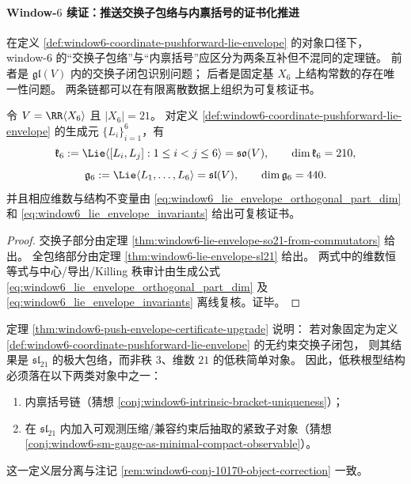 
\paragraph{Window-\(6\) 续证：推送交换子包络与内禀括号的证书化推进}
在定义 \ref{def:window6-coordinate-pushforward-lie-envelope} 的对象口径下，
window-\(6\) 的“交换子包络”与“内禀括号”应区分为两条互补但不混同的定理链。
前者是 \(\mathfrak{gl}(V)\) 内的交换子闭包识别问题；
后者是固定基 \(X_6\) 上结构常数的存在唯一性问题。
两条链都可以在有限离散数据上组织为可复核证书。

\begin{theorem}[推送交换子包络的可核验升级]\label{thm:window6-push-envelope-certificate-upgrade}
令 \(V=\RR\langle X_6\rangle\) 且 \(|X_6|=21\)。
对定义 \ref{def:window6-coordinate-pushforward-lie-envelope} 的生成元 \(\{L_i\}_{i=1}^{6}\)，有
\[
\mathfrak{k}_6:=\Lie\langle [L_i,L_j]:1\le i<j\le 6\rangle=\mathfrak{so}(V),\qquad
\dim \mathfrak{k}_6=210,
\]
\[
\mathfrak{g}_6:=\Lie\langle L_1,\dots,L_6\rangle=\mathfrak{sl}(V),\qquad
\dim \mathfrak{g}_6=440.
\]
并且相应维数与结构不变量由
\eqref{eq:window6_lie_envelope_orthogonal_part_dim}
和
\eqref{eq:window6_lie_envelope_invariants}
给出可复核证书。
\end{theorem}
\begin{proof}
交换子部分由定理 \ref{thm:window6-lie-envelope-so21-from-commutators} 给出。
全包络部分由定理 \ref{thm:window6-lie-envelope-sl21} 给出。
两式中的维数恒等式与中心/导出/Killing 秩审计由生成公式
\eqref{eq:window6_lie_envelope_orthogonal_part_dim}
及 \eqref{eq:window6_lie_envelope_invariants} 离线复核。证毕。
\end{proof}

\begin{remark}[与低秩预期对象的差异定位]\label{rem:window6-conjectural-gap-object-layer}
定理 \ref{thm:window6-push-envelope-certificate-upgrade} 说明：
若对象固定为定义 \ref{def:window6-coordinate-pushforward-lie-envelope} 的无约束交换子闭包，
则其结果是 \(\mathfrak{sl}_{21}\) 的极大包络，而非秩 \(3\)、维数 \(21\) 的低秩简单对象。
因此，低秩根型结构必须落在以下两类对象中之一：
\begin{enumerate}
  \item 内禀括号链（猜想 \ref{conj:window6-intrinsic-bracket-uniqueness}）；
  \item 在 \(\mathfrak{sl}_{21}\) 内加入可观测压缩/兼容约束后抽取的紧致子对象（猜想 \ref{conj:window6-sm-gauge-as-minimal-compact-observable}）。
\end{enumerate}
这一定义层分离与注记 \ref{rem:window6-conj-10170-object-correction} 一致。
\end{remark}

